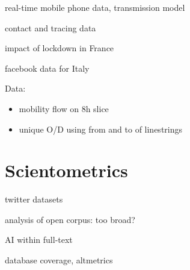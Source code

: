 \documentclass[10pt]{article}
\begin{document}
\cite{jia2020population} real-time mobile phone data, transmission model

\cite{Zhangeabb8001} contact and tracing data


\cite{salje:pasteur-02548181} impact of lockdown in France


\cite{Bonaccorsi15530} facebook data for Italy
	
\cite{kissler2020reductions}
	
Data:

\begin{itemize}
	\item mobility flow on 8h slice
	\item unique O/D using from and to of linestrings
\end{itemize}





\section{Scientometrics}

\cite{inuwadutse2020curated} twitter datasets

\cite{Colavizza2020.04.20.046144} analysis of open corpus: too broad?

\cite{khamsi2020coronavirus} AI within full-text

\cite{2020arXiv200410400K} database coverage, altmetrics

	
	
	
	


	
	
\end{document}
